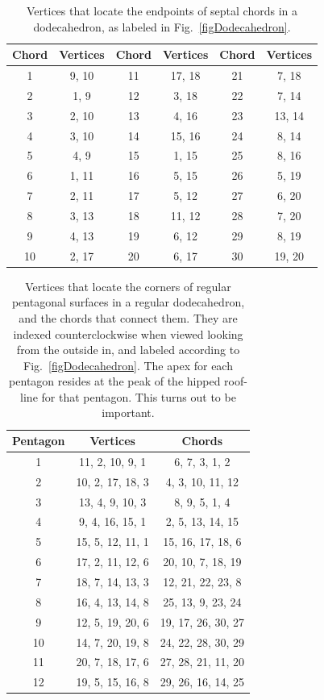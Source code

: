 \begin{table}
	\begin{center}
	\begin{tabular}{|c|c||c|c||c|c|}
		\hline
		Chord & Vertices & Chord & Vertices & Chord & Vertices \\ \hline
		1 & 9, 10 & 11 & 17, 18 & 21 & 7, 18 \\
		2 & 1, 9 & 12 & 3, 18 & 22 & 7, 14 \\
		3 & 2, 10 & 13 & 4, 16 & 23 & 13, 14 \\
		4 & 3, 10 & 14 & 15, 16 & 24 & 8, 14 \\
		5 & 4, 9 & 15 & 1, 15 & 25 & 8, 16 \\
		6 & 1, 11 & 16 & 5, 15 & 26 & 5, 19 \\
		7 & 2, 11 & 17 & 5, 12 & 27 & 6, 20 \\
		8 & 3, 13 & 18 & 11, 12 & 28 & 7, 20 \\
		9 & 4, 13 & 19 & 6, 12 & 29 & 8, 19 \\
		10 & 2, 17 & 20 & 6, 17 & 30 & 19, 20 \\
		\hline
	\end{tabular}
	\end{center}
	\caption{Vertices that locate the endpoints of septal chords in a dodecahedron, as labeled in Fig.~\ref{figDodecahedron}.}
	\label{Tablechordae}
\end{table}

\begin{table}
	\begin{center}
	\begin{tabular}{|c|c|c|}
		\hline
		Pentagon & Vertices & Chords \\ \hline
		1 & 11, 2, 10, 9, 1 & 6, 7, 3, 1, 2 \\
		2 & 10, 2, 17, 18, 3 & 4, 3, 10, 11, 12 \\
		3 & 13, 4, 9, 10, 3 & 8, 9, 5, 1, 4 \\
		4 & 9, 4, 16, 15, 1 & 2, 5, 13, 14, 15 \\
		5 & 15, 5, 12, 11, 1 & 15, 16, 17, 18, 6 \\
		6 & 17, 2, 11, 12, 6 & 20, 10, 7, 18, 19 \\
		7 & 18, 7, 14, 13, 3 & 12, 21, 22, 23, 8 \\
		8 & 16, 4, 13, 14, 8 & 25, 13, 9, 23, 24 \\
		9 & 12, 5, 19, 20, 6 & 19, 17, 26, 30, 27 \\
		10 & 14, 7, 20, 19, 8 & 24, 22, 28, 30, 29 \\
		11 & 20, 7, 18, 17, 6 & 27, 28, 21, 11, 20 \\
		12 & 19, 5, 15, 16, 8 & 29, 26, 16, 14, 25 \\
		\hline
	\end{tabular}
	\end{center}
	\caption{Vertices that locate the corners of regular pentagonal surfaces in a regular dodecahedron, and the chords that connect them.  They are indexed counterclockwise when viewed looking from the outside in, and labeled according to Fig.~\ref{figDodecahedron}.  The apex for each pentagon resides at the peak of the hipped roof-line for that pentagon.  This turns out to be important.} 
	\label{TablePentagons}
\end{table}

